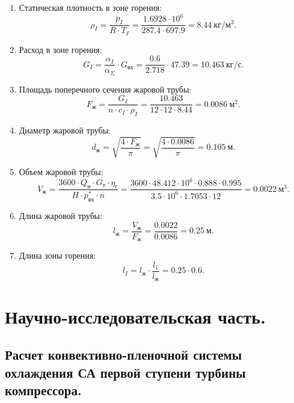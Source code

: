 \documentclass[a4paper,12pt]{article}
\begin{document}
\begin{enumerate}
    	\item Статическая плотность в зоне горения:
    	\[
    		\rho_I = \frac{p_I}{R \cdot T_I} = 
    		\frac{1.6928 \cdot 10^6}{ 287.4 \cdot 697.9} =
    		8.44\ кг/м^3.
    	\]

    	\item Расход в зоне горения:
    	\[
    		G_I = \frac{ \alpha_I }{ \alpha_\Sigma} \cdot G_{вх} = \frac{0.6}{2.718} 
    		\cdot 47.39 = 10.463\ кг/с.
    	\]

    	\item Площадь поперечного сечения жаровой трубы:
    	\[
    		F_ж = \frac{ G_I }{n \cdot c_I \cdot \rho_I} = 
    		\frac{
    			10.463
    			}{
    			12 \cdot 12 \cdot 8.44
    		} = 0.0086\ м^2.
    	\]

    	\item Диаметр жаровой трубы:
    	\[
    		d_ж = \sqrt{ \frac{4 \cdot F_ж}{ \pi } } = \sqrt{\frac{4 \cdot 0.0086}{ \pi }} =
    		0.105\ м.
    	\]

    	\item Объем жаровой трубы:
    	\[
    		V_ж = \frac{3600 \cdot Q_н \cdot G_т \cdot \eta_г}{H \cdot p_{вх}^* \cdot n} = 
    		\frac{
    			3600 \cdot 48.412 \cdot 10^6 \cdot 0.888 \cdot 0.995
    				}{
    			3.5 \cdot 10^6 \cdot 1.7053 \cdot 12
    		} = 
    		0.0022\ м^3.
    	\]

    	\item Длина жаровой трубы:
    	\[
    		l_ж = \frac{V_ж}{F_ж} = \frac{0.0022}{0.0086} =
    		0.25\ м.
    	\]

    	\item Длина зоны горения:
    	\[
    		l_I = l_ж \cdot \frac{l_1}{l_ж} = 0.25 \cdot 0.6.
    	\]

     \end{enumerate}
    

    \section{Научно-исследовательская часть.}
    \subsection{Расчет конвективно-пленочной системы охлаждения СА первой ступени турбины компрессора.}
\end{document}
